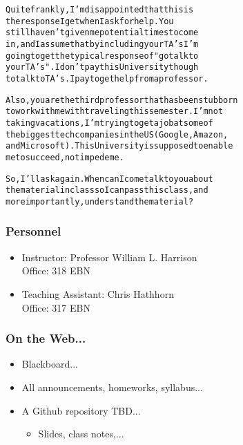 \documentclass{beamer}
\begin{document}
\begin{frame}[fragile]

{\small
\begin{alltt}
Quite frankly, I'm disappointed that this is 
the response I get when I ask for help.  You 
still haven't given me potential times to come 
in, and I assume that by including your TA's I'm 
going to get the typical response of "go talk to 
your TA's".  I don't pay this University though 
to talk to TA's.  I pay to get help from a professor. 

Also, you are the third professor that has been stubborn 
to work with me with traveling this semester. I'm not 
taking vacations, I'm trying to get a job at some of 
the biggest tech companies in the US (Google, Amazon, 
and Microsoft).  This University is supposed to enable 
me to succeed, not impede me.  

So, I'll ask again. When can I come talk to you about 
the material in class so I can pass this class, and 
more importantly, understand the material?  
\end{alltt}
}

\end{frame}

\frame
{
    \frametitle{Personnel}
    
\begin{itemize}
\item Instructor: Professor William L. Harrison\\
Office: 318 EBN
\pause


\item Teaching Assistant: Chris Hathhorn\\
Office: 317 EBN
\end{itemize}
}
\begin{frame}%
    \frametitle{On the Web...}
    
\begin{itemize}
\item Blackboard...
\item All announcements, homeworks, syllabus...

\pause
\item A Github repository TBD...
\begin{itemize}

\item Slides, class notes,...
\end{itemize}
\end{itemize}

\end{frame}
\end{document}
